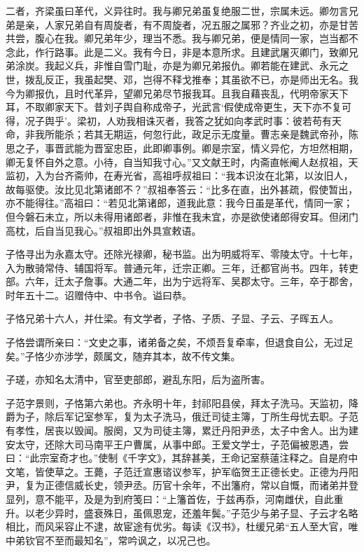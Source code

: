 \documentclass[12pt,UTF8]{ctexbook}
\begin{document}
二者，齐梁虽曰革代，义异往时。我与卿兄弟虽复绝服二世，宗属未远。卿勿言兄弟是亲，人家兄弟自有周旋者，有不周旋者，况五服之属邪？齐业之初，亦是甘苦共尝，腹心在我。卿兄弟年少，理当不悉。我与卿兄弟，便是情同一家，岂当都不念此，作行路事。此是二义。我有今日，非是本意所求。且建武屠灭卿门，致卿兄弟涂炭。我起义兵，非惟自雪门耻，亦是为卿兄弟报仇。卿若能在建武、永元之世，拨乱反正，我虽起樊、邓，岂得不释戈推奉；其虽欲不已，亦是师出无名。我今为卿报仇，且时代革异，望卿兄弟尽节报我耳。且我自藉丧乱，代明帝家天下耳，不取卿家天下。昔刘子舆自称成帝子，光武言‘假使成帝更生，天下亦不复可得，况子舆乎’。梁初，人劝我相诛灭者，我答之犹如向孝武时事：彼若苟有天命，非我所能杀；若其无期运，何忽行此，政足示无度量。曹志亲是魏武帝孙，陈思之子，事晋武能为晋室忠臣，此即卿事例。卿是宗室，情义异佗，方坦然相期，卿无复怀自外之意。小待，自当知我寸心。”又文献王时，内斋直帐阉人赵叔祖，天监初，入为台齐斋帅，在寿光省，高祖呼叔祖曰：“我本识汝在北第，以汝旧人，故每驱使。汝比见北第诸郎不？”叔祖奉答云：“比多在直，出外甚疏，假使暂出，亦不能得往。”高祖曰：“若见北第诸郎，道我此意：我今日虽是革代，情同一家；但今磐石未立，所以未得用诸郎者，非惟在我未宜，亦是欲使诸郎得安耳。但闭门高枕，后自当见我心。”叔祖即出外具宣敕语。

子恪寻出为永嘉太守。还除光禄卿，秘书监。出为明威将军、零陵太守。十七年，入为散骑常侍、辅国将军。普通元年，迁宗正卿。三年，迁都官尚书。四年，转吏部。六年，迁太子詹事。大通二年，出为宁远将军、吴郡太守。三年，卒于郡舍，时年五十二。诏赠侍中、中书令。谥曰恭。

子恪兄弟十六人，并仕梁。有文学者，子恪、子质、子显、子云、子晖五人。

子恪尝谓所亲曰：“文史之事，诸弟备之矣，不烦吾复牵率，但退食自公，无过足矣。”子恪少亦涉学，颇属文，随弃其本，故不传文集。

子瑳，亦知名太清中，官至吏部郎，避乱东阳，后为盗所害。

子范字景则，子恪第六弟也。齐永明十年，封祁阳县侯，拜太子洗马。天监初，降爵为子，除后军记室参军，复为太子洗马，俄迁司徒主簿，丁所生母忧去职。子范有孝性，居丧以毁闻。服阕，又为司徒主簿，累迁丹阳尹丞，太子中舍人。出为建安太守，还除大司马南平王户曹属，从事中郎。王爱文学士，子范偏被恩遇，尝曰：“此宗室奇才也。”使制《千字文》，其辞甚美，王命记室蔡薳注释之。自是府中文笔，皆使草之。王薨，子范迁宣惠谘议参军，护军临贺王正德长史。正德为丹阳尹，复为正德信威长史，领尹丞。历官十余年，不出籓府，常以自慨，而诸弟并登显列，意不能平，及是为到府笺曰：“上籓首佐，于兹再忝，河南雌伏，自此重升。以老少异时，盛衰殊日，虽佩恩宠，还羞年鬓。”子范少与弟子显、子云才名略相比，而风采容止不逮，故宦途有优劣。每读《汉书》，杜缓兄弟“五人至大官，唯中弟钦官不至而最知名”，常吟讽之，以况己也。
\end{document}
